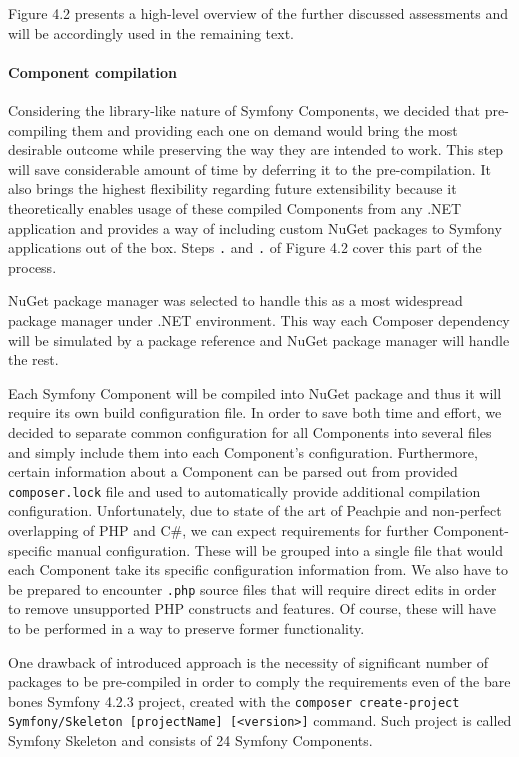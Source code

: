 Figure 4.2 presents a high-level overview of the further discussed assessments and will be accordingly used in the remaining text.

\paragraph{Component compilation} Considering the library-like nature of Symfony Components, we decided that pre-compiling them and providing each one on demand would bring the most desirable outcome while preserving the way they are intended to work. This step will save considerable amount of time by deferring it to the pre-compilation. It also brings the highest flexibility regarding future extensibility because it theoretically enables usage of these compiled Components from any .NET application and provides a way of including custom NuGet packages to Symfony applications out of the box. Steps \texttt{.} and \texttt{.} of Figure 4.2 cover this part of the process.

NuGet package manager was selected to handle this as a most widespread package manager under .NET environment. This way each Composer dependency will be simulated by a package reference and NuGet package manager will handle the rest. 

Each Symfony Component will be compiled into NuGet package and thus it will require its own build configuration file. In order to save both time and effort, we decided to separate common configuration for all Components into several files and simply include them into each Component's configuration. Furthermore, certain information about a Component can be parsed out from provided \texttt{composer.lock} file and used to automatically provide additional compilation configuration. Unfortunately, due to state of the art of Peachpie and non-perfect overlapping of PHP and C\#, we can expect requirements for further Component-specific manual configuration. These will be grouped into a single file that would each Component take its specific configuration information from. We also have to be prepared to encounter \texttt{.php} source files that will require direct edits in order to remove unsupported PHP constructs and features. Of course, these will have to be performed in a way to preserve former functionality.

One drawback of introduced approach is the necessity of significant number of packages to be pre-compiled in order to comply the requirements even of the bare bones Symfony 4.2.3 project, created with the \texttt{composer create-project Symfony/Skeleton [projectName] [<version>]} command. Such project is called Symfony Skeleton and consists of 24 Symfony Components.

